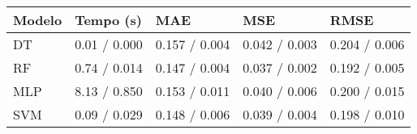 \begin{tabular}{lllll}
\toprule
Modelo & Tempo (s) & MAE & MSE & RMSE \\
\midrule
DT & 0.01 / 0.000 & 0.157 / 0.004 & 0.042 / 0.003 & 0.204 / 0.006 \\
RF & 0.74 / 0.014 & 0.147 / 0.004 & 0.037 / 0.002 & 0.192 / 0.005 \\
MLP & 8.13 / 0.850 & 0.153 / 0.011 & 0.040 / 0.006 & 0.200 / 0.015 \\
SVM & 0.09 / 0.029 & 0.148 / 0.006 & 0.039 / 0.004 & 0.198 / 0.010 \\
\bottomrule
\end{tabular}
